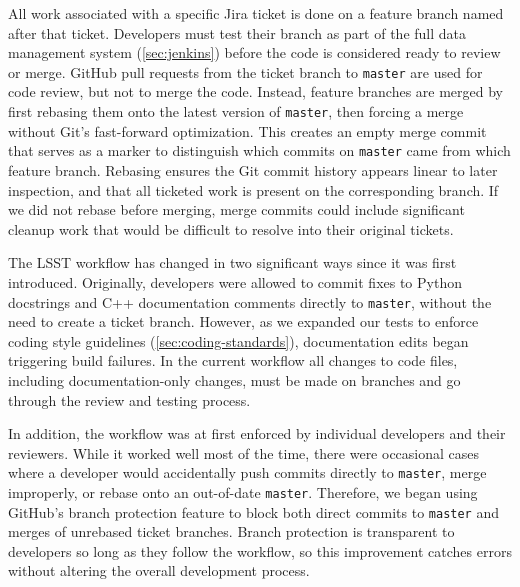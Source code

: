All work associated with a specific Jira ticket is done on a feature branch named after that ticket.
Developers must test their branch as part of the full data management system (\autoref{sec:jenkins}) before the code is considered ready to review or merge.
GitHub pull requests from the ticket branch to \texttt{master} are used for code review, but not to merge the code.
Instead, feature branches are merged by first rebasing them onto the latest version of \texttt{master}, then forcing a merge without Git's fast-forward optimization.
This creates an empty merge commit that serves as a marker to distinguish which commits on \texttt{master} came from which feature branch.
Rebasing ensures the Git commit history appears linear to later inspection, and that all ticketed work is present on the corresponding branch.
If we did not rebase before merging, merge commits could include significant cleanup work that would be difficult to resolve into their original tickets.

The LSST workflow has changed in two significant ways since it was first introduced.
Originally, developers were allowed to commit fixes to Python docstrings and C++ documentation comments directly to \texttt{master}, without the need to create a ticket branch.
However, as we expanded our tests to enforce coding style guidelines (\autoref{sec:coding-standards}), documentation edits began triggering build failures.
In the current workflow all changes to code files, including documentation-only changes, must be made on branches and go through the review and testing process.

In addition, the workflow was at first enforced by individual developers and their reviewers.
While it worked well most of the time, there were occasional cases where a developer would accidentally push commits directly to \texttt{master}, merge improperly, or rebase onto an out-of-date \texttt{master}.
Therefore, we began using GitHub's branch protection feature to block both direct commits to \texttt{master} and merges of unrebased ticket branches.
Branch protection is transparent to developers so long as they follow the workflow, so this improvement catches errors without altering the overall development process.


